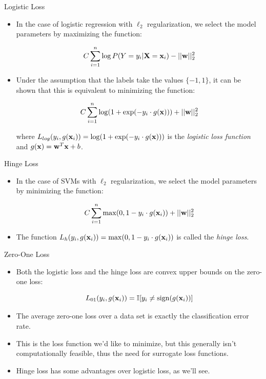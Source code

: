 \documentclass[serif,xcolor=pdftex,dvipsnames,table,hyperref={bookmarks=false}]{beamer}
\begin{document}
\begin{frame}[t]{Logistic Loss}

\begin{itemize}
\setlength{\itemsep}{8pt}
\item In the case of logistic regression with $\ell_2$ regularization, we select the model parameters by maximizing the function:

$$C\sum_{i=1}^n \log P(Y=y_i|{\mathbf{X}}={\mathbf{x}}_i) - ||{\mathbf{w}}||_2^2 $$

\pause\item Under the assumption that the labels take the values $\{-1,1\}$, it can be shown that
this is equivalent to minimizing the function:

$$C\sum_{i=1}^n \log(1+\exp(-y_i \cdot g({\mathbf{x}}))) + ||{\mathbf{w}}||_2^2$$

where $L_{log}(y_i,g({\mathbf{x}}_i)) = \log(1+\exp(-y_i \cdot g({\mathbf{x}})))$ is the \textit{logistic loss function} and 
$g({\mathbf{x}}) = {\mathbf{w}}^T{\mathbf{x}}+b$.


\end{itemize}
\end{frame}

\begin{frame}[t]{Hinge Loss}

\begin{itemize}
\setlength{\itemsep}{8pt}
\item In the case of SVMs with $\ell_2$ regularization, we select the model parameters by minimizing the function:

\begin{align*}
C\sum_{i=1}^n \max(0,1-y_i \cdot g({\mathbf{x}}_i)) +  ||{\mathbf{w}}||_2^2 
\end{align*}

\pause\item The function $L_{h}(y_i,g({\mathbf{x}}_i))= \max(0,1-y_i \cdot g({\mathbf{x}}_i))$ is called the \textit{hinge loss}.

\end{itemize}
\end{frame}

\begin{frame}[t]{Zero-One Loss}

\begin{itemize}
\setlength{\itemsep}{8pt}
\item Both the logistic loss and the hinge loss are convex upper bounds on the zero-one loss:

$$L_{01}(y_i,g({\mathbf{x}}_i)) = \mathbb{I}[y_i \neq \operatorname*{sign}(g({\mathbf{x}}_i))]$$

\pause\item The average zero-one loss over a data set is exactly the classification error rate.

\pause\item This is the loss function we'd like to minimize, but this generally isn't computationally feasible, thus the need for surrogate loss functions.

\pause\item Hinge loss has some advantages over logistic loss, as we'll see.


\end{itemize}
\end{frame}
\end{document}
